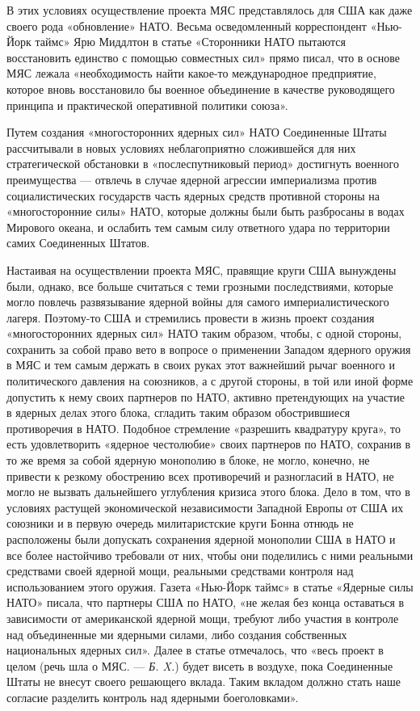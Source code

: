 \documentclass[12pt, a4paper, openany]{book}
\begin{document}
		В этих условиях осуществление проекта МЯС представлялось для США как даже своего рода «обновление» НАТО. Весьма осведомленный корреспондент «Нью-Йорк таймс» Ярю Миддлтон в статье «Сторонники НАТО пытаются восстановить единство с помощью совместных сил» прямо писал, что в основе МЯС лежала «необходимость найти какое-то международное предприятие, которое вновь восстановило бы военное объединение в качестве руководящего принципа и практической оперативной политики союза».
		
		
		Путем создания «многосторонних ядерных сил» НАТО Соединенные Штаты рассчитывали в новых условиях неблагоприятно сложившейся для них стратегической обстановки в «послеспутниковый период» достигнуть военного преимущества — отвлечь в случае ядерной агрессии империализма против социалистических государств часть ядерных средств противной стороны на «многосторонние силы» НАТО, которые должны были быть разбросаны в водах Мирового океана, и ослабить тем самым силу ответного удара по территории самих Соединенных Штатов.
		
		Настаивая на осуществлении проекта МЯС, правящие круги США вынуждены были, однако, все больше считаться с теми грозными последствиями, которые могло повлечь развязывание ядерной войны для самого империалистического лагеря. Поэтому-то США и стремились провести в жизнь проект создания «многосторонних ядерных сил» НАТО таким образом, чтобы, с одной стороны, сохранить за собой право вето в вопросе о применении Западом ядерного оружия в МЯС и тем самым держать в своих руках этот важнейший рычаг военного и политического давления на союзников, а с другой стороны, в той или иной форме допустить к нему своих партнеров по НАТО, активно претендующих на участие в ядерных делах этого блока, сгладить таким образом обострившиеся противоречия в НАТО. Подобное стремление «разрешить квадратуру круга», то есть удовлетворить «ядерное честолюбие» своих партнеров по НАТО, сохранив в то же время за собой ядерную монополию в блоке, не могло, конечно, не привести к резкому обострению всех противоречий и разногласий в НАТО, не могло не вызвать дальнейшего углубления кризиса этого блока. Дело в том, что в условиях растущей экономической независимости Западной Европы от США их союзники и в первую очередь милитаристские круги Бонна отнюдь не расположены были допускать сохранения ядерной монополии США в НАТО и все более настойчиво требовали от них, чтобы они поделились с ними реальными средствами своей ядерной мощи, реальными средствами контроля над использованием этого оружия. Газета «Нью-Йорк таймс» в статье «Ядерные силы НАТО» писала, что партнеры США по НАТО, «не желая без конца оставаться в зависимости от американской ядерной мощи, требуют либо участия в контроле над объединенные ми ядерными силами, либо создания собственных национальных ядерных сил». Далее в статье отмечалось, что «весь проект в целом (речь шла о МЯС. — \textit{Б. X.}) будет висеть в воздухе, пока Соединенные Штаты не внесут своего решающего вклада. Таким вкладом должно стать наше согласие разделить контроль над ядерными боеголовками».
		
\end{document}
